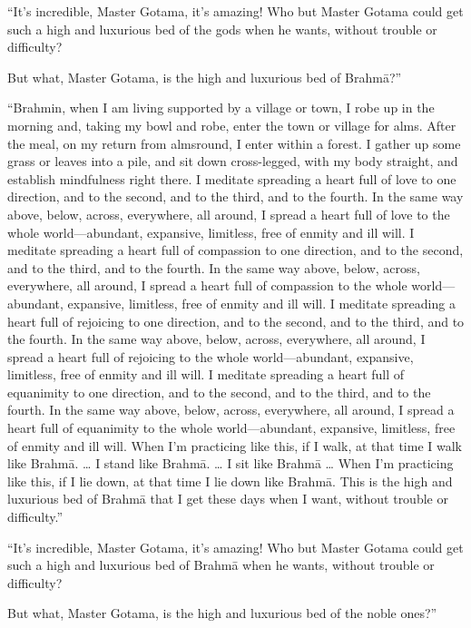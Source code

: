 \documentclass[12pt,openany]{book}%
\begin{document}
“It’s incredible, Master Gotama, it’s amazing! Who but Master Gotama could get such a high and luxurious bed of the gods when he wants, without trouble or difficulty? 

But what, Master Gotama, is the high and luxurious bed of \textsanskrit{Brahmā}?” 

“Brahmin, when I am living supported by a village or town, I robe up in the morning and, taking my bowl and robe, enter the town or village for alms. After the meal, on my return from almsround, I enter within a forest. I gather up some grass or leaves into a pile, and sit down cross-legged, with my body straight, and establish mindfulness right there. I meditate spreading a heart full of love to one direction, and to the second, and to the third, and to the fourth. In the same way above, below, across, everywhere, all around, I spread a heart full of love to the whole world—abundant, expansive, limitless, free of enmity and ill will. I meditate spreading a heart full of compassion to one direction, and to the second, and to the third, and to the fourth. In the same way above, below, across, everywhere, all around, I spread a heart full of compassion to the whole world—abundant, expansive, limitless, free of enmity and ill will. I meditate spreading a heart full of rejoicing to one direction, and to the second, and to the third, and to the fourth. In the same way above, below, across, everywhere, all around, I spread a heart full of rejoicing to the whole world—abundant, expansive, limitless, free of enmity and ill will. I meditate spreading a heart full of equanimity to one direction, and to the second, and to the third, and to the fourth. In the same way above, below, across, everywhere, all around, I spread a heart full of equanimity to the whole world—abundant, expansive, limitless, free of enmity and ill will. When I’m practicing like this, if I walk, at that time I walk like \textsanskrit{Brahmā}. … I stand like \textsanskrit{Brahmā}. … I sit like \textsanskrit{Brahmā} … When I’m practicing like this, if I lie down, at that time I lie down like \textsanskrit{Brahmā}. This is the high and luxurious bed of \textsanskrit{Brahmā} that I get these days when I want, without trouble or difficulty.” 

“It’s incredible, Master Gotama, it’s amazing! Who but Master Gotama could get such a high and luxurious bed of \textsanskrit{Brahmā} when he wants, without trouble or difficulty? 

But what, Master Gotama, is the high and luxurious bed of the noble ones?” 
\end{document}
